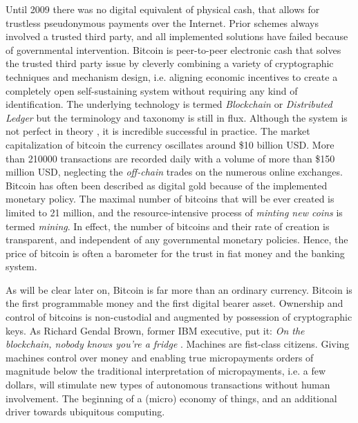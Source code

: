 Until 2009 there was no digital equivalent of physical cash, that allows for trustless pseudonymous payments over the Internet. Prior schemes always involved a trusted third party, and all implemented solutions have failed because of governmental intervention. Bitcoin is peer-to-peer electronic cash \parencite{nakamoto2008bitcoin} that solves the trusted third party issue by cleverly combining a variety of cryptographic techniques and mechanism design, i.e. aligning economic incentives to create a completely open self-sustaining system without requiring any kind of identification. The underlying technology is termed \emph{Blockchain} or \emph{Distributed Ledger} but the terminology and taxonomy is still in flux. Although the system is not perfect in theory \parencite{Eyal2014}, it is incredible successful in practice. The market capitalization of bitcoin the currency oscillates around \$10 billion USD. More than 210000 transactions are recorded daily with a volume of more than \$150 million USD, neglecting the \emph{off-chain} trades on the numerous online exchanges. Bitcoin has often been described as digital gold because of the implemented monetary policy. The maximal number of bitcoins that will be ever created is limited to 21 million, and the resource-intensive process of \emph{minting new coins} is termed \emph{mining}. In effect, the number of bitcoins and their rate of creation is transparent, and independent of any governmental monetary policies. Hence, the price of bitcoin is often a barometer for the trust in fiat money and the banking system.

As will be clear later on, Bitcoin is far more than an ordinary currency. Bitcoin is the first programmable money and the first digital bearer asset. Ownership and control of bitcoins is non-custodial and augmented by possession of cryptographic keys. As Richard Gendal Brown, former IBM executive, put it: \emph{On the blockchain, nobody knows you're a fridge} \parencite{brown2013}. Machines are fist-class citizens. Giving machines control over money and enabling true micropayments orders of magnitude below the traditional interpretation of micropayments, i.e. a few dollars, will stimulate new types of autonomous transactions without human involvement. The beginning of a (micro) economy of things, and an additional driver towards ubiquitous computing.

